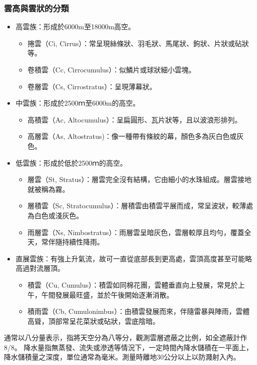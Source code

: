 \documentclass[a4paper,12pt]{report}
\begin{document}
\begin{itemize}
\subsubsection{雲高與雲狀的分類}
\begin{itemize}
\item 高雲族：形成於6000m至18000m高空。
\begin{itemize}
\item 捲雲（Ci, Cirrus）：常呈現絲條狀、羽毛狀、馬尾狀、鉤狀、片狀或砧狀等。
\item 卷積雲（Cc, Cirrocumulus）：似鱗片或球狀細小雲塊。
\item 卷層雲（Cs, Cirrostratus）：呈現薄幕狀。
\end{itemize}
\item 中雲族：形成於2500ｍ至6000m的高空。
\begin{itemize}
\item 高積雲（Ac, Altocumulus）：呈扁圓形、瓦片狀等，且以波浪形排列。
\item 高層雲（As, Altostratus)：像一種帶有條紋的幕，顏色多為灰白色或灰色。
\end{itemize}
\item 低雲族：形成於低於2500ｍ的高空。
\begin{itemize}
\item 層雲（St, Stratus）：層雲完全沒有結構，它由細小的水珠組成。層雲接地就被稱為霧。
\item 層積雲（Sc, Stratocumulus）：層積雲由積雲平展而成，常呈波狀，較薄處為白色或淺灰色。
\item 雨層雲（Ns, Nimbostratus）：雨層雲呈暗灰色，雲層較厚且均勻，覆蓋全天，常伴隨持續性降雨。
\end{itemize}
\item 直展雲族：有強上升氣流，故可一直從底部長到更高處，雲頂高度甚至可能略高過對流層頂。
\begin{itemize}
\item 積雲（Cu, Cumulus）：積雲如同棉花團，雲體垂直向上發展，常見於上午，午間發展最旺盛，並於午後開始逐漸消散。
\item 積雨雲（Cb, Cumulonimbus）：由積雲發展而來，伴隨雷暴與陣雨，雲體高聳，頂部常呈花菜狀或砧狀，雲底陰暗。
\end{itemize}
\end{itemize}
通常以八分量表示，指將天空分為八等分，觀測雲層遮蔽之比例，如全遮蔽計作8/8。
降水量指無蒸發、流失或滲透等情況下，一定時間內降水儲積在一平面上，降水儲積量之深度，單位通常為毫米。測量時離地30公分以上以防濺射入內。

\end{itemize}
\end{document}
